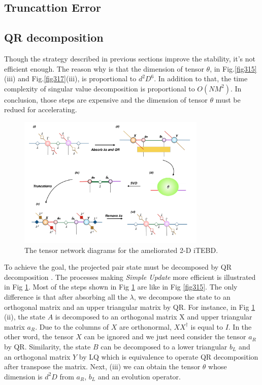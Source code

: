 \subsection{Truncattion Error}

\subsection{QR decomposition}

Though the strategy described in previous sections improve the stability, it's not efficient enough. The reason why is that the dimension of tensor $\theta$, in Fig.\ref{fig315}(iii) and Fig.\ref{fig317}(iii), is proportional to $d^2D^6$. In addition to that, the time complexity of singular value decomposition is proportional to $O(NM^2)$. In conclusion, those steps are expensive and the dimension of tensor $\theta$ must be redued for accelerating. 
\label{2doptQR} \begin{figure}[H] \centering \includegraphics[width=0.80\textwidth]{figures/fig318.png} \caption[The tensor network diagrams for the ameliorated 2-D iTEBD with QR decompositiont]{The tensor network diagrams for the ameliorated 2-D iTEBD.} \label{fig318} \end{figure} To achieve the goal, the projected pair state must be decomposed by QR decomposition \cite{li_efficient_2012} \cite{yang_accelerated_2007}. The processes making \textit{Simple Update} more efficient is illustrated in Fig \ref{fig318}.  Most of the steps shown in Fig \ref{fig318} are like in Fig \ref{fig315}. The only difference is that after absorbing all the $\lambda$, we decompose the state to an orthogonal matrix and an upper triangular matrix by QR. For instance, in Fig \ref{fig318} (ii), the state $A$ is decomposed to an orthogonal matrix X and upper triangular matrix $a_R$. Due to the columns of $X$ are orthonormal, $XX^{\dagger}$ is equal to $I$. In the other word, the tensor $X$ can be ignored and we just need consider the tensor $a_R$ by QR. Similarity, the state $B$ can be decomposed to a lower triangular $b_L$ and an orthogonal matrix $Y$ by LQ which is equivalence to operate QR decomposition after transpose the matrix. Next, (iii) we can obtain the tensor $\theta$ whose dimension is $d^2D$ from $a_R$, $b_L$ and an evolution operator.

